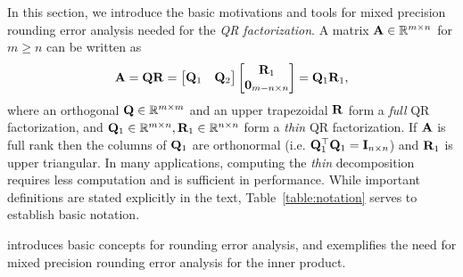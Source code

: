 In this section, we introduce the basic motivations and tools for mixed precision rounding error analysis needed for the {\it QR factorization}.
A matrix $\mathbf{A} \in \mathbb{R}^{m \times n}$ for $m\geq n$ can be written as
\[\bb{A} = \bb{QR}=\begin{bmatrix}\bb{Q}_{1} & \bb{Q}_2\end{bmatrix} \begin{bmatrix}\bb{R}_{1} \\ \bb{0}_{m-n \times n}\end{bmatrix} = \bb{Q}_{1}\bb{R}_{1},%
\]
where an orthogonal $\mathbf{Q}\in\mathbb{R}^{m\times m}$ and an upper trapezoidal $\mathbf{R}$ form a \emph{full} QR factorization, and $\mathbf{Q}_{1}\in\mathbb{R}^{m\times n},\mathbf{R}_{1}\in\mathbb{R}^{n\times n}$ form a \emph{thin} QR factorization.
If $\mathbf{A}$ is full rank then the columns of $\mathbf{Q}_{1}$ are orthonormal (i.e. $\mathbf{Q}_{1}^{\top}\mathbf{Q}_{1}=\mathbf{I}_{n\times n}$) and $\mathbf{R}_1$ is upper triangular.
In many applications, computing the \emph{thin} decomposition requires less computation and is sufficient in performance. 
While important definitions are stated explicitly in the text, Table~\ref{table:notation} serves to establish basic notation.

 introduces basic concepts for rounding error analysis, and  exemplifies the need for mixed precision rounding error analysis for the inner product.
